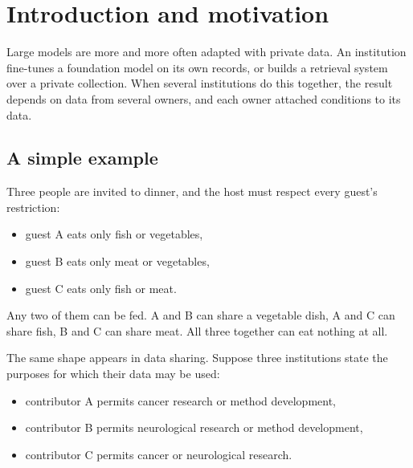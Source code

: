 \documentclass[sigconf,anonymous,review]{acmart}
\begin{document}


\maketitle

\section{Introduction and motivation}

Large models are more and more often adapted with private data. An institution
fine-tunes a foundation model on its own records, or builds a retrieval system
over a private collection. When several institutions do this together, the
result depends on data from several owners, and each owner attached conditions
to its data.

\subsection{A simple example}
\label{sec:example}

Three people are invited to dinner, and the host must respect every guest's
restriction:

\begin{itemize}
\item guest A eats only fish or vegetables,
\item guest B eats only meat or vegetables,
\item guest C eats only fish or meat.
\end{itemize}

Any two of them can be fed. A and B can share a vegetable dish, A and C can share
fish, B and C can share meat. All three together can eat nothing at all.

The same shape appears in data sharing. Suppose three institutions state the
purposes for which their data may be used:

\begin{itemize}
\item contributor A permits cancer research or method development,
\item contributor B permits neurological research or method development,
\item contributor C permits cancer or neurological research.
\end{itemize}
\end{document}
